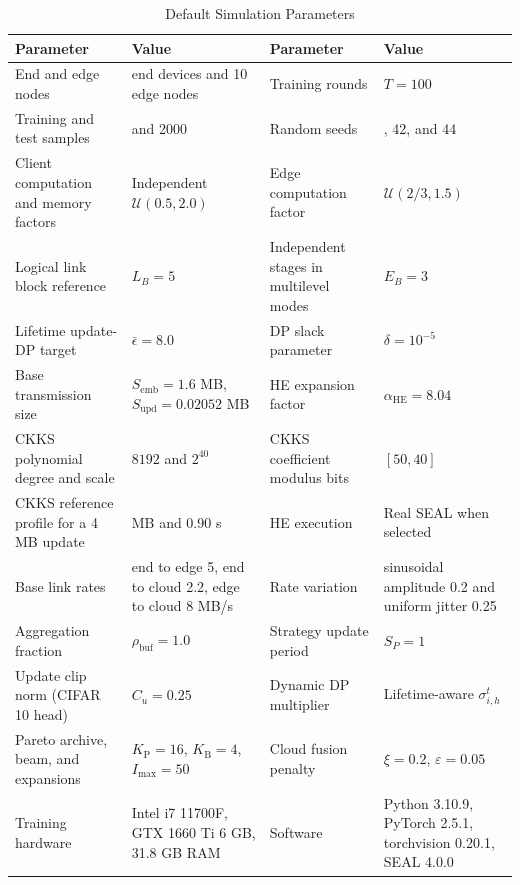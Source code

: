 \documentclass[5p,times]{elsarticle}
\theoremstyle{plain}
\theoremstyle{definition}
\theoremstyle{remark}
\begin{document}
\begin{table}[t]
\centering
\caption{Default Simulation Parameters}
\label{tab:sim_params}
\scriptsize
\setlength{\tabcolsep}{3pt}
\begin{tabularx}{\textwidth}{@{}>{\raggedright\arraybackslash}p{}>{\centering\arraybackslash}p{}>{\raggedright\arraybackslash}p{}>{\centering\arraybackslash}X@{}}
\hline
\textbf{Parameter} & \textbf{Value} & \textbf{Parameter} & \textbf{Value} \\
\hline
End and edge nodes & 100 end devices and 10 edge nodes & Training rounds & \(T=100\) \\
Training and test samples & 12000 and 2000 & Random seeds & 40, 42, and 44 \\
Client computation and memory factors & Independent $\mathcal U(0.5,2.0)$ & Edge computation factor & $\mathcal U(2/3,1.5)$ \\
Logical link block reference & \(L_B=5\) & Independent stages in multilevel modes & \(E_B=3\) \\
Lifetime update-DP target & \(\bar\epsilon=8.0\) & DP slack parameter & \(\delta=10^{-5}\) \\
Base transmission size & \(S_{\mathrm{emb}}=1.6\) MB, \(S_{\mathrm{upd}}=0.02052\) MB & HE expansion factor & \(\alpha_{\mathrm{HE}}=8.04\) \\
CKKS polynomial degree and scale & \(8192\) and \(2^{40}\) & CKKS coefficient modulus bits & \([50,40]\) \\
CKKS reference profile for a 4 MB update & 32.14 MB and 0.90 s & HE execution & Real SEAL when selected \\
Base link rates & end to edge 5, end to cloud 2.2, edge to cloud 8 MB/s & Rate variation & sinusoidal amplitude 0.2 and uniform jitter 0.25 \\
Aggregation fraction & $\rho_{\mathrm{buf}}=1.0$ & Strategy update period & $S_P=1$ \\
Update clip norm (CIFAR 10 head) & $C_u=0.25$ & Dynamic DP multiplier & Lifetime-aware $\sigma_{i,h}^t$ \\
Pareto archive, beam, and expansions & $K_{\mathrm P}=16$, $K_{\mathrm B}=4$, $I_{\max}=50$ & Cloud fusion penalty & $\xi=0.2$, $\varepsilon=0.05$ \\
Training hardware & Intel i7 11700F, GTX 1660 Ti 6 GB, 31.8 GB RAM & Software & Python 3.10.9, PyTorch 2.5.1, torchvision 0.20.1, SEAL 4.0.0 \\
\hline
\end{tabularx}
\end{table}
\end{document}
